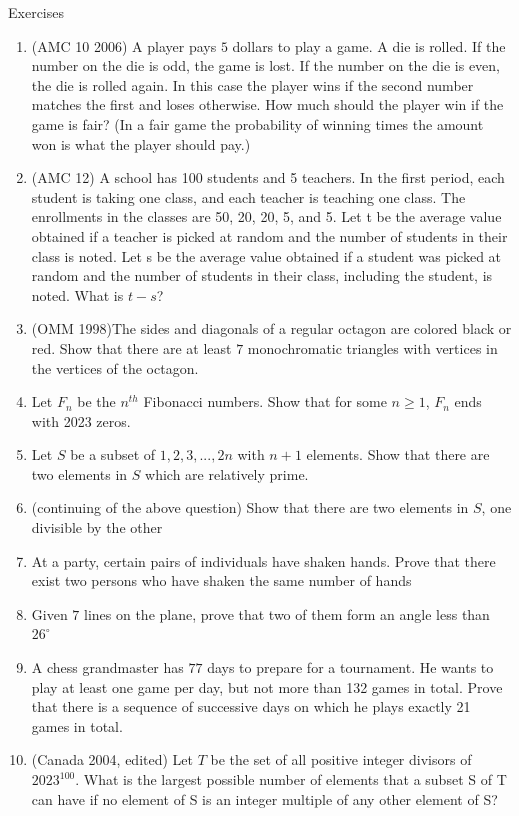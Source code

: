 \begin{xcb}{Exercises}
    \begin{enumerate}
\item (AMC 10 2006) A player pays $5$ dollars to play a game. A die is rolled. If the number on the die is odd, the game is lost. If the number on the die is even, the die is rolled again. In this case the player wins if the second number matches the first and loses otherwise. How much should the player win if the game is fair? (In a fair game the probability of winning times the amount won is what the player should pay.)
\item(AMC 12) A school has 100 students and 5 teachers. In the first period, each student is taking one class, and each teacher is teaching one class. The enrollments in the classes are 50, 20, 20, 5, and 5. Let t be the average value obtained if a teacher is picked at random and the number of students in their class is noted. Let s be the average value obtained if a student was picked at random and the number of students in their class, including the student, is noted. What is $t-s$?
\item (OMM 1998)The sides and diagonals of a regular octagon are colored black or red. Show that there are at least $7$ monochromatic triangles with vertices in the vertices of the octagon.
\item  Let $F_n$ be the $n^{th}$ Fibonacci numbers. Show that for some $n \geq 1$, $F_n$ ends with 2023 zeros.
\item Let $S$ be a subset of ${1, 2, 3, . . . , 2n}$ with $n + 1$ elements. Show that there are two elements in $S$ which are relatively prime.
\item (continuing of the above question) Show that there are two elements in $S$, one divisible by the other
\item At a party, certain pairs of individuals have shaken hands. Prove that there exist two persons who have shaken the same number of hands
\item Given $7$ lines on the plane, prove that two of them form an angle less than $26^{\circ}$
\item A chess grandmaster has $77$ days to prepare for a tournament. He wants to play at least one game per day, but not more than 132 games in total. Prove that there is a sequence of successive days on which he plays exactly 21 games in total.
\item (Canada 2004, edited) Let $T$ be the set of all positive integer divisors of $2023^{100}$. What is the largest possible number of elements that a subset S of T can have if no element of S is an integer multiple of any other element of S?

\end{enumerate}
\end{xcb}

